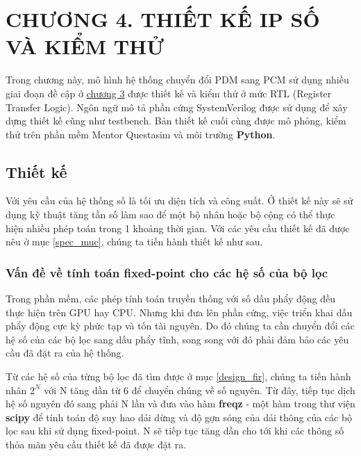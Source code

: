 \section*{CHƯƠNG 4. THIẾT KẾ IP SỐ VÀ KIỂM THỬ} \label{chuong4}
\setcounter{section}{4}
\setcounter{subsection}{0}
\setcounter{figure}{0}
\setcounter{table}{0}
Trong chương này, mô hình hệ thống chuyển đổi PDM sang PCM sử dụng nhiều giai đoạn đề cập ở \hyperref[chuong3]{chương 3} được thiết kế và kiểm thử ở mức RTL (Register Transfer Logic). Ngôn ngữ mô tả phần cứng SystemVerilog được sử dụng để xây dựng thiết kế cũng như testbench. Bản thiết kế cuối cùng được mô phỏng, kiểm thử trên phần mềm Mentor Questasim và môi trường \textbf{Python}.
\subsection{Thiết kế}
Với yêu cầu của hệ thống số là tối ưu diện tích và công suất. Ở thiết kế này sẽ sử dụng kỹ thuật tăng tần số làm sao để một bộ nhân hoặc bộ cộng có thể thực hiện nhiều phép toán trong 1 khoảng thời gian. Với các yêu cầu thiết kế đã được nêu ở mục \ref{spec_muc}, chúng ta tiến hành thiết kế như sau.
\subsubsection{Vấn đề về tính toán fixed-point cho các hệ số của bộ lọc} \label{fix-fil}
Trong phần mềm, các phép tính toán truyền thống với số dấu phẩy động đều thực hiện
trên GPU hay CPU. Nhưng khi đưa lên phần cứng, việc triển khai dấu phẩy động cực kỳ phức tạp và tốn tài nguyên. Do đó chúng ta cần chuyển đổi các hệ số của các bộ lọc sang dấu phẩy tĩnh, song song với đó phải đảm bảo các yêu cầu đã đặt ra của hệ thống.

Từ các hệ số của từng bộ lọc đã tìm được ở mục \ref{design_fir}, chúng ta tiến hành nhân $2^N$ với N tăng dần từ 6 để chuyển chúng về số nguyên. Từ đây, tiếp tục dịch hệ số nguyên đó sang phải N lần và đưa vào hàm \textbf{freqz} - một hàm trong thư viện \textbf{scipy} để tính toán độ suy hao dải dừng và độ gợn sóng của dải thông của các bộ lọc sau khi sử dụng fixed-point. N sẽ tiếp tục tăng dần cho tới khi các thông số thỏa mãn yêu cầu thiết kế đã được đặt ra. 

